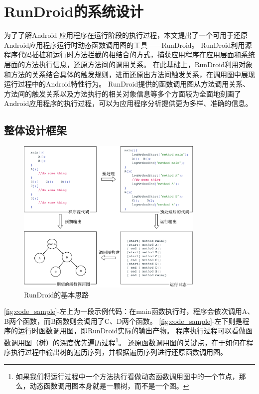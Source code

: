 \chapter{RunDroid的系统设计}
\label{chp:design}





为了了解Android 应用程序在运行阶段的执行过程，本文提出了一个可用于还原Android应用程序运行时动态函数调用图的工具——RunDroid。
RunDroid利用源程序代码插桩和运行时方法拦截的相结合的方式，捕获应用程序在应用层面和系统层面的方法执行信息，还原方法间的调用关系。
在此基础上，RunDroid利用对象和方法的关系结合具体的触发规则，进而还原出方法间触发关系，在调用图中展现运行过程中的Android特性行为。
RunDroid提供的函数调用图从方法调用关系、方法间的触发关系以及方法执行的相关对象信息等多个方面较为全面地刻画了Android应用程序的执行过程，可以为应用程序分析提供更为多样、准确的信息。


\section{整体设计框架}



\begin{figure}[!ht]
	\centering
	\includegraphics[width=0.8\textwidth]{./Figures/code-sample.png}
	\caption{RunDroid的基本思路}
	\label{fig:code_sample}
\end{figure}


\autoref{fig:code_sample}-左上为一段示例代码：在main函数执行时，程序会依次调用A、B两个函数，而B函数则会调用了C、D两个函数。
\autoref{fig:code_sample}-左下则是程序的运行时函数调用图，即RunDroid实际的输出产物。
程序执行过程可以看做函数调用图（树）的深度优先遍历过程\footnote{如果我们将运行过程中一个方法执行看做动态函数调用图中的一个节点，那么，动态函数调用图本身就是一颗树，而不是一个图。}。
还原函数调用图的关键点，在于如何在程序执行过程中输出树的遍历序列，并根据遍历序列进行还原函数调用图。

